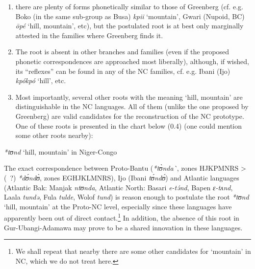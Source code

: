 \begin{enumerate}
\item there are plenty of forms phonetically similar to those of Greenberg (cf. e.g. Boko (in the same sub-group as Busa) \textit{kpii} ‘mountain’, Gwari (Nupoid, BC) \textit{{\={o}}p{\'{e}}} ‘hill, mountain’, etc), but the postulated root is at best only marginally attested in the families where Greenberg finds it. 
\item The root is absent in other branches and families (even if the proposed phonetic correspondences are approached most liberally), although, if wished, its “reflexes” can be found in any of the NC families, cf. e.g. Ibani (Ijo) \textit{kp{\'{o}}kp{\'{o}}} ‘hill’, etc. 
\item Most importantly, several other roots with the meaning ‘hill, mountain’ are distinguishable in the NC languages. All of them (unlike the one proposed by Greenberg) are valid candidates for the reconstruction of the NC prototype. One of these roots is presented in the chart below (0.4) (one could mention some other roots nearby):
\end{enumerate}


\begin{table}
\caption{\textit{*tʊnd} ‘hill, mountain’ in Niger-Congo} 
\label{tab:0.4}

\end{table}

The exact correspondence between Proto-Bantu (\textit{*t{\`{ʊ}}nda\`{}}, zones HJKPMNRS > (~?) \textit{*d{\'{ʊ}}nd{\`{ʊ}}},  zones EGHJKLMNRS), Ijo (Ibani \textit{t{\'{ʊ}}nd{\'{ʊ}}}) and Atlantic languages (Atlantic Bak: Manjak \textit{ntʊnda}, Atlantic North: Basari \textit{e-t{\'{ə}}nd}, Bapen \textit{ɛ{}-tʌnd}, Laala \textit{tundə}, Fula \textit{tulde}, Wolof \textit{tund}) is reason enough to postulate the root \textit{*tʊnd} ‘hill, mountain’ at the Proto-NC level, especially since these languages have apparently been out of direct contact.\footnote{We shall repeat that nearby there are some other candidates for ‘mountain’ in NC, which we do not treat here.} In addition, the absence of this root in Gur{}-Ubangi{}-Adamawa may prove to be a shared innovation in these languages.

